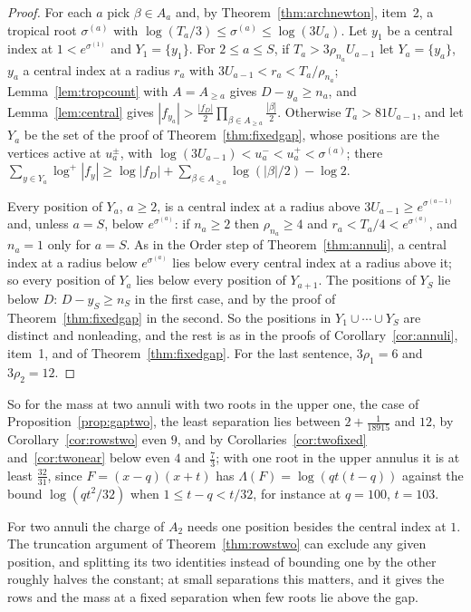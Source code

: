 \documentclass[11pt]{article}
\begin{document}
\begin{proof}
For each $a$ pick $\beta\in A_a$ and, by Theorem~\ref{thm:archnewton},
item~2, a tropical root $\sigma^{(a)}$ with
$\log(T_a/3)\le\sigma^{(a)}\le\log(3U_a)$.  Let $y_1$ be a central index at
$1<e^{\sigma^{(1)}}$ and $Y_1=\{y_1\}$.  For $2\le a\le S$, if
$T_a>3\rho_{n_a}U_{a-1}$ let $Y_a=\{y_a\}$, $y_a$ a central index at a radius
$r_a$ with $3U_{a-1}<r_a<T_a/\rho_{n_a}$; Lemma~\ref{lem:tropcount} with
$A=A_{\ge a}$ gives $D-y_a\ge n_a$, and Lemma~\ref{lem:central} gives
$|f_{y_a}|>\frac{|f_D|}2\prod_{\beta\in A_{\ge a}}\frac{|\beta|}2$.  Otherwise
$T_a>81U_{a-1}$, and let $Y_a$ be the set of the proof of
Theorem~\ref{thm:fixedgap}, whose positions are the vertices active at
$u_a^\pm$, with $\log(3U_{a-1})<u_a^-<u_a^+<\sigma^{(a)}$; there
$\sum_{y\in Y_a}\log^+|f_y|\ge\log|f_D|+\sum_{\beta\in A_{\ge a}}\log(|\beta|/2)-\log2$.

Every position of $Y_a$, $a\ge2$, is a central index at a radius above
$3U_{a-1}\ge e^{\sigma^{(a-1)}}$ and, unless $a=S$, below $e^{\sigma^{(a)}}$:
if $n_a\ge2$ then $\rho_{n_a}\ge4$ and $r_a<T_a/4<e^{\sigma^{(a)}}$, and
$n_a=1$ only for $a=S$.  As in the Order step of Theorem~\ref{thm:annuli},
a central index at a radius below $e^{\sigma^{(a)}}$ lies below every central
index at a radius above it; so every position of $Y_a$ lies below every
position of $Y_{a+1}$.  The positions of $Y_S$ lie below $D$: $D-y_S\ge n_S$
in the first case, and by the proof of Theorem~\ref{thm:fixedgap} in the
second.  So the positions in $Y_1\cup\cdots\cup Y_S$ are distinct and
nonleading, and the rest is as in the proofs of Corollary~\ref{cor:annuli},
item~1, and of Theorem~\ref{thm:fixedgap}.  For the last sentence,
$3\rho_1=6$ and $3\rho_2=12$.
\end{proof}

So for the mass at two annuli with two roots in the upper one, the case of
Proposition~\ref{prop:gaptwo}, the least separation lies between
$2+\frac1{18915}$ and $12$, by Corollary~\ref{cor:rowstwo} even $9$, and
by Corollaries~\ref{cor:twofixed} and~\ref{cor:twonear} below even $4$ and
$\frac73$; with one root in the upper annulus it is at
least $\frac{32}{31}$, since $F=(x-q)(x+t)$ has
$\Lambda(F)=\log(qt(t-q))$ against the bound $\log(qt^2/32)$ when
$1\le t-q<t/32$, for instance at $q=100$, $t=103$.

For two annuli the charge of $A_2$ needs one position besides the central
index at $1$.  The truncation argument of Theorem~\ref{thm:rowstwo} can
exclude any given position, and splitting its two identities instead of
bounding one by the other roughly halves the constant; at small separations
this matters, and it gives the rows and the mass at a fixed separation when
few roots lie above the gap.
\end{document}
